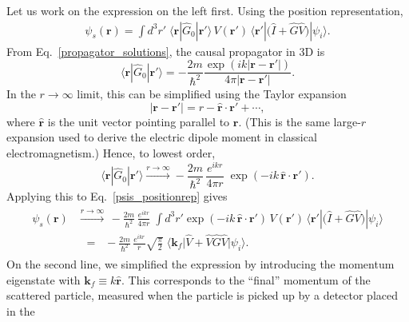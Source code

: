 \documentclass[pra,12pt]{revtex4-2}
\begin{document}
Let us work on the expression on the left first.  Using the position
representation,
\begin{align}
  \psi_s(\mathbf{r}) = \int d^3r'\; \langle\mathbf{r}|\hat{G}_0|\mathbf{r}'\rangle\, V(\mathbf{r}')\, \langle \mathbf{r}'| \big(\hat{I} + \hat{G} \hat{V}\big) |\psi_i\rangle.
  \label{psis_positionrep}
\end{align}
From Eq.~\eqref{propagator_solutions}, the causal propagator in 3D is
\begin{equation}
  \langle\mathbf{r}|\hat{G}_0|\mathbf{r}'\rangle =
  - \frac{2m}{\hbar^2}
  \frac{\exp\left(ik|\mathbf{r}-\mathbf{r}'|\right)}{4\pi|\mathbf{r}-\mathbf{r}'|}.
\end{equation}
In the $r\rightarrow\infty$ limit, this can be simplified using the
Taylor expansion
\begin{equation}
  |\mathbf{r} - \mathbf{r}'| = r - \hat{\mathbf{r}} \cdot \mathbf{r}' + \cdots,
\end{equation}
where $\hat{\mathbf{r}}$ is the unit vector pointing parallel to
$\mathbf{r}$.  (This is the same large-$r$ expansion used to derive
the electric dipole moment in classical electromagnetism.)  Hence, to
lowest order,
\begin{equation}
  \langle\mathbf{r}|\hat{G}_0|\mathbf{r}'\rangle \overset{r\rightarrow\infty}{\longrightarrow} - \frac{2m}{\hbar^2}\, \frac{e^{ikr}}{4\pi r}\; \exp\left(-ik \, \hat{\mathbf{r}} \cdot \mathbf{r}'\right).
\end{equation}
Applying this to Eq.~\eqref{psis_positionrep} gives
\begin{align}
  \begin{aligned}\psi_s(\mathbf{r})
    &\overset{r\rightarrow\infty}{\longrightarrow} \, - \frac{2m}{\hbar^2} \, \frac{e^{ikr}}{4\pi r}\; \int d^3r' \exp\left(-ik \, \hat{\mathbf{r}} \cdot \mathbf{r}'\right)\, V(\mathbf{r}')\,
    \langle \mathbf{r}'| \big(\hat{I} + \hat{G} \hat{V}\big) |\psi_i\rangle \\
    &\;\;=\;\; - \frac{2m}{\hbar^2} \, \frac{e^{ikr}}{r} \sqrt{\frac{\pi}{2}} \; \big\langle \mathbf{k}_f \big|\hat{V} + \hat{V} \hat{G} \hat{V}
    \big|\psi_i\big\rangle. \end{aligned}
  \label{psis_intermediate}
\end{align}
On the second line, we simplified the expression by introducing the
momentum eigenstate with $\mathbf{k}_f \equiv k \hat{\mathbf{r}}$.
This corresponds to the ``final'' momentum of the scattered particle,
measured when the particle is picked up by a detector placed in the
\end{document}
